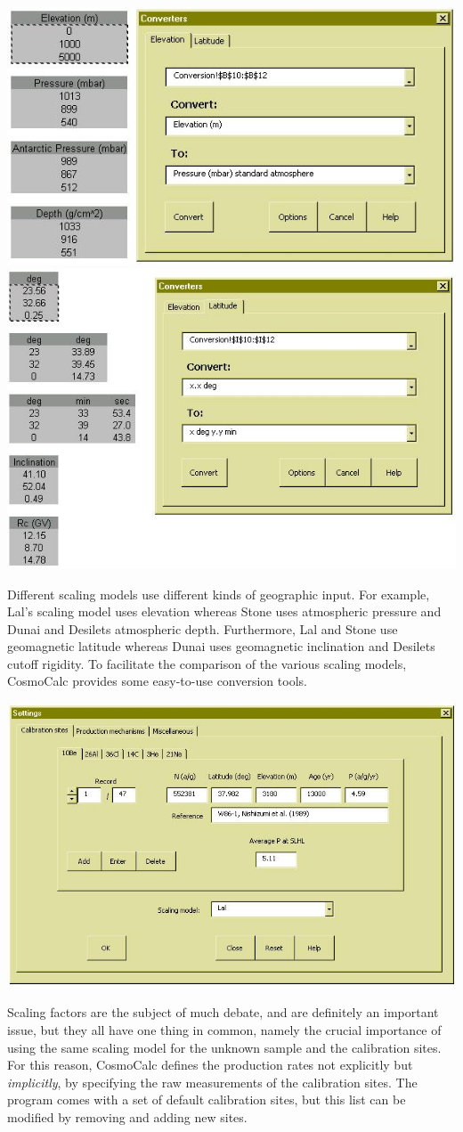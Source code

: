 \documentclass[12pt]{article}
\begin{document}
\begin{minipage}[tbp]{\textwidth}
\begin{center}
  \includegraphics[width=.49\textwidth]{converterElev.jpg}
  \includegraphics[width=.5\textwidth]{converterLat.jpg}\\
\end{center}
  Different scaling  models use different  kinds of geographic  input. 
  For example,  Lal's scaling model uses elevation  whereas Stone uses
  atmospheric  pressure  and Dunai  and  Desilets  atmospheric depth.  
  Furthermore, Lal  and Stone  use geomagnetic latitude  whereas Dunai
  uses  geomagnetic  inclination  and  Desilets cutoff  rigidity.   To
  facilitate the  comparison of the various  scaling models, CosmoCalc
  provides some easy-to-use conversion tools.
  \\
\end{minipage}

\begin{minipage}[tbp]{\textwidth}
  \begin{center}
  \includegraphics[width=.65\textwidth]{settingsCalSites.jpg}\\
  \end{center}
  Scaling factors are  the subject of much debate,  and are definitely
  an important  issue, but they all  have one thing  in common, namely
  the  crucial importance  of using  the  same scaling  model for  the
  unknown  sample  and  the   calibration  sites.   For  this  reason,
  CosmoCalc  defines  the production  rates  not  explicitly but  {\it
    implicitly}, by specifying the raw measurements of the calibration
  sites.  The program  comes with a set of  default calibration sites,
  but this list can be modified by removing and adding new sites.
  \\
\end{minipage}
\end{document}
